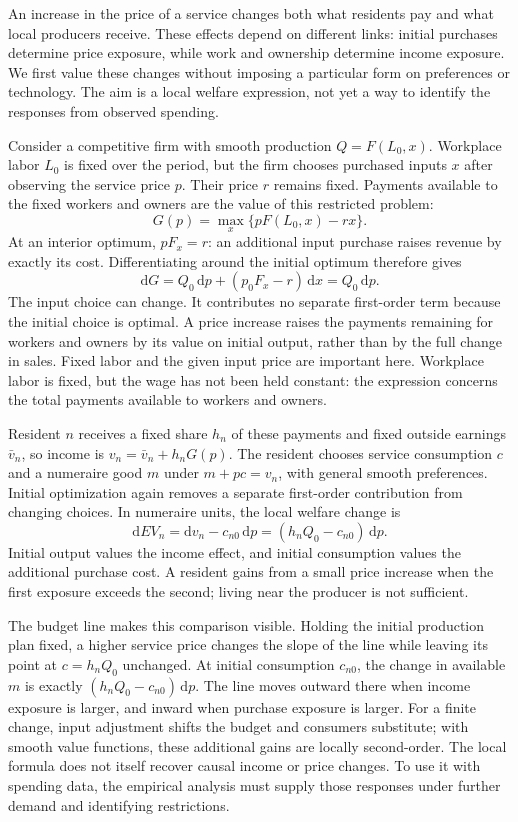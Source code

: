 An increase in the price of a service changes both what residents pay and what
local producers receive. These effects depend on different links: initial purchases
determine price exposure, while work and ownership determine income exposure.
We first value these changes without imposing a particular form on preferences
or technology. The aim is a local welfare expression, not yet a way to identify
the responses from observed spending.

Consider a competitive firm with smooth production $Q=F(L_0,x)$. Workplace labor
$L_0$ is fixed over the period, but the firm chooses purchased inputs $x$ after
observing the service price $p$. Their price $r$ remains fixed. Payments available
to the fixed workers and owners are the value of this restricted problem:
\[
G(p)=\max_x\{pF(L_0,x)-rx\}.
\]
At an interior optimum, $pF_x=r$: an additional input purchase raises revenue
by exactly its cost. Differentiating around the initial optimum therefore gives
\[
\mathrm dG=Q_0\,\mathrm dp+(p_0F_x-r)\,\mathrm dx=Q_0\,\mathrm dp.
\]
The input choice can change. It contributes no separate first-order term because
the initial choice is optimal. A price increase raises the payments remaining for
workers and owners by its value on initial output, rather than by the full change
in sales. Fixed labor and the given input price are important here. Workplace
labor is fixed, but the wage has not been held constant: the expression
concerns the total payments available to workers and owners.

Resident $n$ receives a fixed share $h_n$ of these payments and fixed outside
earnings $\bar v_n$, so income is $v_n=\bar v_n+h_nG(p)$. The resident chooses
service consumption $c$ and a numeraire good $m$ under $m+pc=v_n$, with general
smooth preferences. Initial optimization again removes a separate first-order
contribution from changing choices. In numeraire units, the local welfare change is
\[
\mathrm dEV_n=\mathrm dv_n-c_{n0}\,\mathrm dp
             =(h_nQ_0-c_{n0})\,\mathrm dp.
\]
Initial output values the income effect, and initial consumption values the
additional purchase cost. A resident gains from a small price increase when the
first exposure exceeds the second; living near the producer is not sufficient.

The budget line makes this comparison visible. Holding the initial production
plan fixed, a higher service price changes the slope of the line while leaving its
point at $c=h_nQ_0$ unchanged. At initial consumption $c_{n0}$, the change in
available $m$ is exactly $(h_nQ_0-c_{n0})\,\mathrm dp$. The line moves outward
there when income exposure is larger, and inward when purchase exposure is larger.
For a finite change, input adjustment shifts the budget and consumers substitute;
with smooth value functions, these additional gains are locally second-order. The local
formula does not itself recover causal income or price changes. To use it with
spending data, the empirical analysis must supply those responses under further
demand and identifying restrictions.
